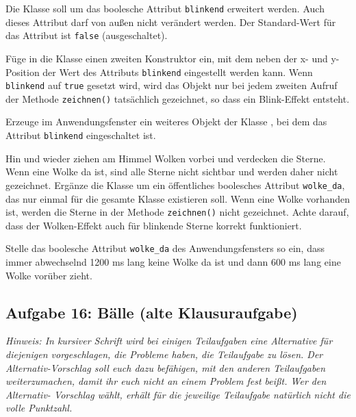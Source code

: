 \begin{compactenum}[a)]
\item Die Klasse  soll um das boolesche Attribut
\lstinline|blinkend| erweitert werden. Auch dieses Attribut darf von außen nicht
verändert werden. Der Standard-Wert für das Attribut ist \lstinline|false|
(ausgeschaltet).

Füge in die Klasse einen zweiten Konstruktor ein, mit dem neben der x- und
y-Position der Wert des Attributs \lstinline|blinkend| eingestellt werden kann.
Wenn \lstinline|blinkend| auf \lstinline|true| gesetzt wird, wird das Objekt nur
bei jedem zweiten Aufruf der Methode \lstinline|zeichnen()| tatsächlich
gezeichnet, so dass ein Blink-Effekt entsteht. 

Erzeuge im Anwendungsfenster ein weiteres Objekt der Klasse , bei
dem das Attribut \lstinline|blinkend| eingeschaltet ist.

\item Hin und wieder ziehen am Himmel Wolken vorbei und verdecken die Sterne.
Wenn eine Wolke da ist, sind alle Sterne nicht sichtbar und werden daher nicht
gezeichnet. Ergänze die Klasse  um ein öffentliches boolesches
Attribut \lstinline|wolke_da|, das nur einmal für die gesamte Klasse existieren
soll.
Wenn eine Wolke vorhanden ist, werden die Sterne in der Methode
\lstinline|zeichnen()| nicht gezeichnet. Achte darauf, dass der Wolken-Effekt
auch für blinkende Sterne korrekt funktioniert.

Stelle das boolesche Attribut \lstinline|wolke_da| des Anwendungsfensters so
ein, dass immer abwechselnd 1200 ms lang keine Wolke da ist und dann 600 ms
lang eine Wolke vorüber zieht.
\end{compactenum}


\subsection{Aufgabe 16: Bälle (alte Klausuraufgabe)}

\emph{Hinweis: In kursiver Schrift wird bei einigen Teilaufgaben eine
Alternative für diejenigen vorgeschlagen, die Probleme haben, die Teilaufgabe
zu lösen. Der Alternativ-Vorschlag soll euch dazu befähigen, mit den anderen
Teilaufgaben weiterzumachen, damit ihr euch nicht an einem Problem fest beißt.
Wer den Alternativ- Vorschlag wählt, erhält für die jeweilige Teilaufgabe
natürlich nicht die volle Punktzahl.}


